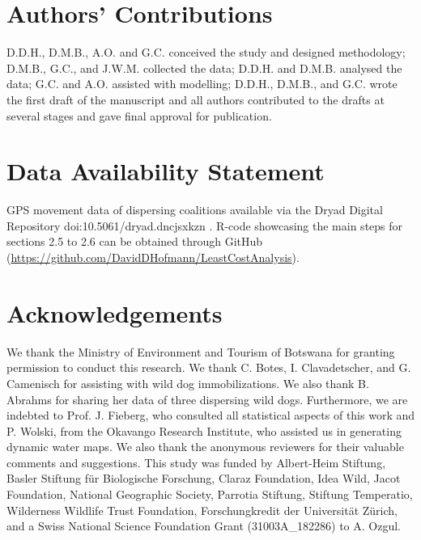 \documentclass[abstract=on,10pt,a4paper,bibliography=totocnumbered]{article}
\begin{document}
\section{Authors' Contributions}
D.D.H., D.M.B., A.O. and G.C. conceived the study and designed methodology;
D.M.B., G.C., and J.W.M. collected the data; D.D.H. and D.M.B. analysed the
data; G.C. and A.O. assisted with modelling; D.D.H., D.M.B., and G.C. wrote the
first draft of the manuscript and all authors contributed to the drafts at
several stages and gave final approval for publication.

\section{Data Availability Statement}
GPS movement data of dispersing coalitions available via the Dryad Digital
Repository doi:10.5061/dryad.dncjsxkzn \citep{Hofmann.2021}. R-code showcasing
the main steps for sections 2.5 to 2.6 can be obtained through GitHub
(\url{https://github.com/DavidDHofmann/LeastCostAnalysis}).

\section{Acknowledgements}
We thank the Ministry of Environment and Tourism of Botswana for granting
permission to conduct this research. We thank C. Botes, I. Clavadetscher, and G.
Camenisch for assisting with wild dog immobilizations. We also thank B. Abrahms
for sharing her data of three dispersing wild dogs. Furthermore, we are indebted
to Prof. J. Fieberg, who consulted all statistical aspects of this work and P.
Wolski, from the Okavango Research Institute, who assisted us in generating
dynamic water maps. We also thank the anonymous reviewers for their valuable
comments and suggestions. This study was funded by Albert-Heim Stiftung, Basler
Stiftung für Biologische Forschung, Claraz Foundation, Idea Wild, Jacot
Foundation, National Geographic Society, Parrotia Stiftung, Stiftung Temperatio,
Wilderness Wildlife Trust Foundation, Forschungkredit der Universität Zürich,
and a Swiss National Science Foundation Grant (31003A\_182286) to A. Ozgul.

\newpage
\begingroup
\singlespacing

\endgroup
\end{document}

